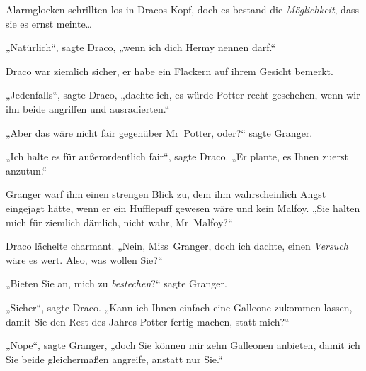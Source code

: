 Alarmglocken schrillten los in Dracos Kopf, doch es bestand die \emph{Möglichkeit}, dass sie es ernst meinte…

„Natürlich“, sagte Draco, „wenn ich dich Hermy nennen darf.“

Draco war ziemlich sicher, er habe ein Flackern auf ihrem Gesicht bemerkt.

„Jedenfalls“, sagte Draco, „dachte ich, es würde Potter recht geschehen, wenn wir ihn beide angriffen und ausradierten.“

„Aber das wäre nicht fair gegenüber Mr~Potter, oder?“ sagte Granger.

„Ich halte es für außerordentlich fair“, sagte Draco. „Er plante, es Ihnen zuerst anzutun.“

Granger warf ihm einen strengen Blick zu, dem ihm wahrscheinlich Angst eingejagt hätte, wenn er ein Hufflepuff gewesen wäre und kein Malfoy. „Sie halten mich für ziemlich dämlich, nicht wahr, Mr~Malfoy?“

Draco lächelte charmant. „Nein, Miss~Granger, doch ich dachte, einen \emph{Versuch} wäre es wert. Also, was wollen Sie?“

„Bieten Sie an, mich zu \emph{bestechen}?“ sagte Granger.

„Sicher“, sagte Draco. „Kann ich Ihnen einfach eine Galleone zukommen lassen, damit Sie den Rest des Jahres Potter fertig machen, statt mich?“

„Nope“, sagte Granger, „doch Sie können mir zehn Galleonen anbieten, damit ich Sie beide gleichermaßen angreife, anstatt nur Sie.“

